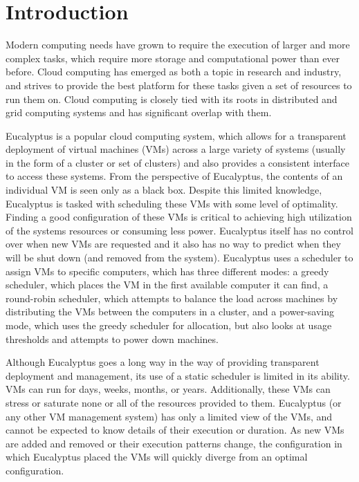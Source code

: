 \section{Introduction}
\label{sec:intro}

   Modern computing needs have grown to require the execution of larger and more complex tasks, which require more storage and computational power than ever before.  Cloud computing has emerged as both a topic in research and industry, and strives to provide the best platform for these tasks given a set of resources to run them on.  Cloud computing is closely tied with its roots in distributed and grid computing systems and has significant overlap with them.  

  Eucalyptus is a popular cloud computing system, which allows for a transparent deployment of virtual machines (VMs) across a large variety of systems (usually in the form of a cluster or set of clusters) and also provides a consistent interface to access these systems.  From the perspective of Eucalyptus, the contents of an individual VM is seen only as a black box.  Despite this limited knowledge, Eucalyptus is tasked with scheduling these VMs with some level of optimality.  Finding a good configuration of these VMs is critical to achieving high utilization of the systems resources or consuming less power.  Eucalyptus itself has no control over when new VMs are requested and it also has no way to predict when they will be shut down (and removed from the system).  Eucalyptus uses a scheduler to assign VMs to specific computers, which has three different modes: a greedy scheduler, which places the VM in the first available computer it can find, a round-robin scheduler, which attempts to balance the load across machines by distributing the VMs between the computers in a cluster, and a power-saving mode, which uses the greedy scheduler for allocation, but also looks at usage thresholds and attempts to power down machines.

  Although Eucalyptus goes a long way in the way of providing transparent deployment and management, its use of a static scheduler is limited in its ability.  VMs can run for days, weeks, months, or years.  Additionally, these VMs can stress or saturate none or all of the resources provided to them.  Eucalyptus (or any other VM management system) has only a limited view of the VMs, and cannot be expected to know details of their execution or duration.  As new VMs are added and removed or their execution patterns change, the configuration in which Eucalyptus placed the VMs will quickly diverge from an optimal configuration.

